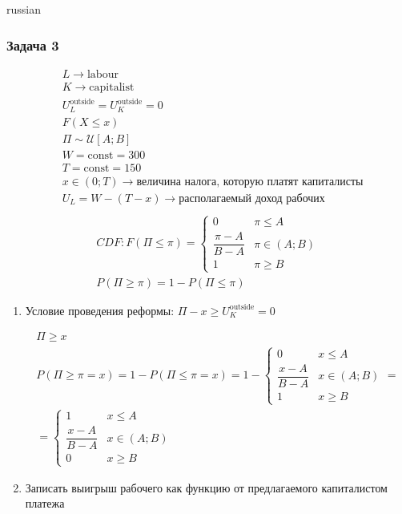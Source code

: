 \documentclass{article}
\begin{document}
\begin{otherlanguage*}{russian}
\subsubsection*{Задача 3}
\begin{align*}
& L \rightarrow \text{labour} \\ 
& K \rightarrow \text{capitalist} \\
& U_L^{\text{outside}} = U_K^{\text{outside}} = 0 \\
& F(X \le x) \\ 
& \Pi \sim \mathcal{U} [A; B] \\
& W = \text{const} = 300 \\ 
& T = \text{const} = 150 \\
& x \in (0; T) \rightarrow \text{величина налога, которую платят капиталисты} \\
& U_L  = W - (T - x) \rightarrow \text{располагаемый доход рабочих} \\ 
\end{align*}
\begin{align*}
CDF: F( \Pi \le \pi) = \begin{cases} 0 & \pi \le A \\ \dfrac{\pi - A}{B - A} & \pi \in (A; B) \\ 1 & \pi \ge B \end{cases} \\
P (\Pi \ge \pi) = 1 - P( \Pi \le \pi) 
\end{align*}
\begin{enumerate}
\item Условие проведения реформы: $ \Pi - x \ge U^{\text{outside}}_K = 0 $ 

\begin{align*}
\Pi \ge x \\
P(\Pi \ge \pi = x) = 1 - P ( \Pi \le \pi = x) = 1 - \begin{cases} 0 & x \le A \\ \dfrac{x - A}{B - A} & x \in (A; B) \\ 1 & x \ge B \end{cases} = \\
= \begin{cases} 1 &  x \le A \\ \dfrac{x - A}{B - A} & x \in (A; B) \\ 0 & x \ge B \end{cases} 
\end{align*}
\item Записать выигрыш рабочего как функцию от предлагаемого капиталистом платежа 


\end{enumerate}
\end{otherlanguage*}
\end{document}
